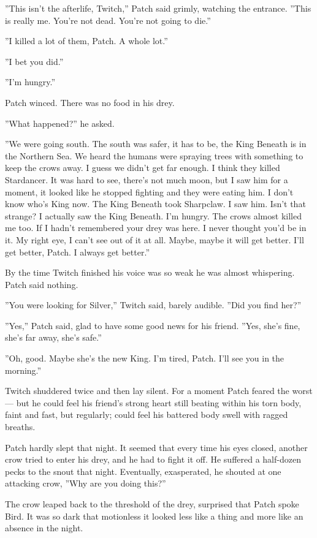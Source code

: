 \documentclass[12pt]{book}
\begin{document}
''This isn't the afterlife, Twitch,'' Patch said grimly, watching the
entrance. ''This is really me. You're not dead. You're not going to
die.''

''I killed a lot of them, Patch. A whole lot.''

''I bet you did.''

''I'm hungry.''

Patch winced. There was no food in his drey.

''What happened?'' he asked.

''We were going south. The south was safer, it has to be, the King
Beneath is in the Northern Sea. We heard the humans were spraying
trees with something to keep the crows away. I guess we didn't get far
enough. I think they killed Stardancer. It was hard to see, there's
not much moon, but I saw him for a moment, it looked like he stopped
fighting and they were eating him. I don't know who's King now. The
King Beneath took Sharpclaw. I saw him. Isn't that strange? I actually
saw the King Beneath. I'm hungry. The crows almost killed me too. If I
hadn't remembered your drey was here. I never thought you'd be in
it. My right eye, I can't see out of it at all. Maybe, maybe it will
get better. I'll get better, Patch. I always get better.''

By the time Twitch finished his voice was so weak he was almost
whispering. Patch said nothing.

''You were looking for Silver,'' Twitch said, barely audible. ''Did
you find her?''

''Yes,'' Patch said, glad to have some good news for his
friend. ''Yes, she's fine, she's far away, she's safe.''

''Oh, good. Maybe she's the new King. I'm tired, Patch. I'll see you
in the morning.''

Twitch shuddered twice and then lay silent. For a moment Patch feared
the worst --- but he could feel his friend's strong heart still
beating within his torn body, faint and fast, but regularly; could
feel his battered body swell with ragged breaths.

Patch hardly slept that night. It seemed that every time his eyes
closed, another crow tried to enter his drey, and he had to fight it
off. He suffered a half-dozen pecks to the snout that
night. Eventually, exasperated, he shouted at one attacking crow,
''Why are you doing this?''

The crow leaped back to the threshold of the drey, surprised that
Patch spoke Bird. It was so dark that motionless it looked less like a
thing and more like an absence in the night.
\end{document}
